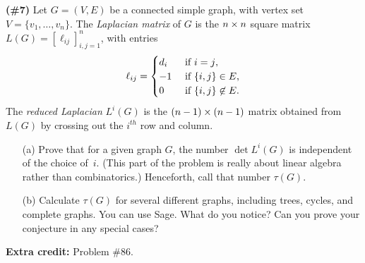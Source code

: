 {\bf(\#7)} Let $G=(V,E)$ be a connected simple graph, with vertex set $V=\{v_1,\dots,v_n\}$.  The \emph{Laplacian matrix} of $G$ is the $n\times n$ square matrix $L(G)=[\ell_{ij}]_{i,j=1}^n$, with entries
\[\ell_{ij}=\begin{cases}{d_i}&\text{ if $i=j$,}\\{-1}&\text{ if $\{i,j\}\in E$,}\\{0}&\text{ if $\{i,j\}\not\in E$.}\end{cases}\]
The \emph{reduced Laplacian} $L^i(G)$ is the $(n-1)\times(n-1)$ matrix obtained from $L(G)$ by crossing out the $i^{th}$ row and column.
\begin{enumerate}
\item[(a)] Prove that for a given graph $G$, the number $\det L^i(G)$ is independent of the choice of~$i$.  (This part of the problem is really about linear algebra rather than combinatorics.)  Henceforth, call that number $\tau(G)$.  
\item[(b)] Calculate $\tau(G)$ for several different graphs, including trees, cycles, and complete graphs.  You can use Sage.  What do you notice?  Can you prove your conjecture in any special cases?
\end{enumerate}

\bigskip
\bigskip

{\bf Extra credit:} Problem \#86.
\bigskip
